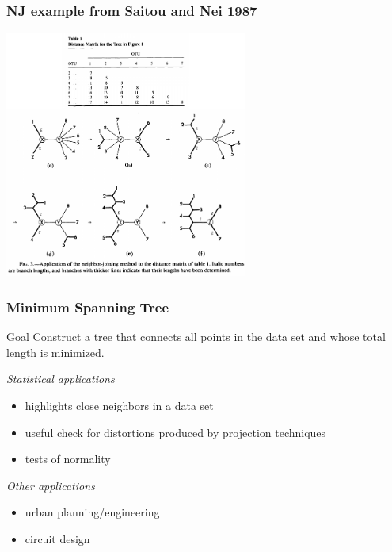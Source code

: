 \documentclass{beamer}
\begin{document}
\begin{frame}
\frametitle{NJ example from Saitou and Nei 1987}
\begin{center}
\includegraphics[height=3.2in]{saitou-nj-example.pdf}    
\end{center}
\end{frame}




\begin{frame}
  \frametitle{Minimum Spanning Tree}

\begin{block}{Goal}
Construct a tree that connects all points in the data set and whose total length is minimized.
\end{block}

\emph{Statistical applications}
\begin{itemize}
    \item highlights close neighbors in a data set
    \item useful check for distortions produced by projection techniques
    \item tests of normality
\end{itemize}
\medskip

\emph{Other applications}
\begin{itemize}
    \item urban planning/engineering
    \item circuit design
\end{itemize}

\end{frame}
\end{document}

